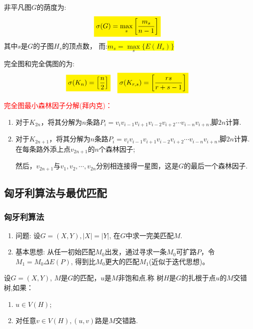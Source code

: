 \begin{theorem}
	非平凡图$G$的荫度为:
	\[
	\colorbox{yellow}{$\sigma(G)=\max\limits_{s}\left[\dfrac{m_s}{n-1}\right]$}
	\]
	其中$s$是$G$的子图$H_s$的顶点数， 而:\colorbox{yellow}{$m_s=\max\limits_{s}\{E(H_s)\}$}
\end{theorem}
\begin{theorem}
	完全图和完全偶图的为:
	\[
	\colorbox{yellow}{$\sigma(K_n)=\left[\dfrac{n}{2}\right]$}\quad \colorbox{yellow}{$\sigma(K_{r,s})=\left[\dfrac{rs}{r+s-1}\right]$}
	\]
	
\end{theorem}

\noindent \textcolor{red}{完全图最小森林因子分解(拜内克)：}
\begin{enumerate}
	\item 对于$K_{2n}$，将其分解为$n$条路$P_i = v_iv_{i-1}v_{i+1}v_{i-2}v_{i+2}\cdots v_{i-n}v_{i+n}$,脚$2n$计算.
	\item 对于$K_{2n+1}$，将其分解为$n$条路$P_i = v_iv_{i-1}v_{i+1}v_{i-2}v_{i+2}\cdots v_{i-n}v_{i+n}$,脚$2n$计算. 在每条路外添上点$v_{2n+1}$的$n$个森林因子;
	
	然后，$v_{2n+1}$与$v_1,v_2,\cdots,v_{2n}$分别相连接得一星图，这是$G$的最后一个森林因子.
\end{enumerate}

\subsection{匈牙利算法与最优匹配}

\subsubsection{匈牙利算法}

\begin{enumerate}
	\item 问题: 设$G=(X, Y), |X|=|Y|$, 在$G$中求一完美匹配$M$.
	\item 基本思想: 从任一初始匹配$M_0$出发，通过寻求一条$M_0$可扩路$P$，令
	$M_1=M_0\varDelta E(P)$, 得到比$M_0$更大的匹配$M_1$(近似于迭代思想)。
\end{enumerate}
\begin{definition}
	设$G=(X, Y)$, $M$是$G$的匹配，$u$是$M$非饱和点.称
	树$H$是$G$的扎根于点$u$的$M$交错树,如果：
	\begin{enumerate}
		\item $u\in V(H)$;
		\item 对任意$v \in V(H), (u, v)$路是$M$交错路.
	\end{enumerate}
\end{definition}

